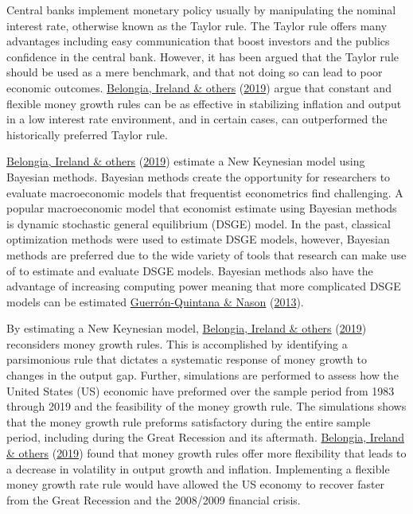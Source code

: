 \documentclass[11pt,preprint, authoryear]{elsarticle}
\numberwithin{equation}{section}
\numberwithin{figure}{section}
\numberwithin{table}{section}
\begin{document}
Central banks implement monetary policy usually by manipulating the
nominal interest rate, otherwise known as the Taylor rule. The Taylor
rule offers many advantages including easy communication that boost
investors and the publics confidence in the central bank. However, it
has been argued that the Taylor rule should be used as a mere benchmark,
and that not doing so can lead to poor economic outcomes.
\protect\hyperlink{ref-belongia2019reconsideration}{Belongia, Ireland \&
others} (\protect\hyperlink{ref-belongia2019reconsideration}{2019})
argue that constant and flexible money growth rules can be as effective
in stabilizing inflation and output in a low interest rate environment,
and in certain cases, can outperformed the historically preferred Taylor
rule.

\protect\hyperlink{ref-belongia2019reconsideration}{Belongia, Ireland \&
others} (\protect\hyperlink{ref-belongia2019reconsideration}{2019})
estimate a New Keynesian model using Bayesian methods. Bayesian methods
create the opportunity for researchers to evaluate macroeconomic models
that frequentist econometrics find challenging. A popular macroeconomic
model that economist estimate using Bayesian methods is dynamic
stochastic general equilibrium (DSGE) model. In the past, classical
optimization methods were used to estimate DSGE models, however,
Bayesian methods are preferred due to the wide variety of tools that
research can make use of to estimate and evaluate DSGE models. Bayesian
methods also have the advantage of increasing computing power meaning
that more complicated DSGE models can be estimated
\protect\hyperlink{ref-guerron2013bayesian}{Guerrón-Quintana \& Nason}
(\protect\hyperlink{ref-guerron2013bayesian}{2013}).

By estimating a New Keynesian model,
\protect\hyperlink{ref-belongia2019reconsideration}{Belongia, Ireland \&
others} (\protect\hyperlink{ref-belongia2019reconsideration}{2019})
reconsiders money growth rules. This is accomplished by identifying a
parsimonious rule that dictates a systematic response of money growth to
changes in the output gap. Further, simulations are performed to assess
how the United States (US) economic have preformed over the sample
period from 1983 through 2019 and the feasibility of the money growth
rule. The simulations shows that the money growth rule preforms
satisfactory during the entire sample period, including during the Great
Recession and its aftermath.
\protect\hyperlink{ref-belongia2019reconsideration}{Belongia, Ireland \&
others} (\protect\hyperlink{ref-belongia2019reconsideration}{2019})
found that money growth rules offer more flexibility that leads to a
decrease in volatility in output growth and inflation. Implementing a
flexible money growth rate rule would have allowed the US economy to
recover faster from the Great Recession and the 2008/2009 financial
crisis.
\end{document}

